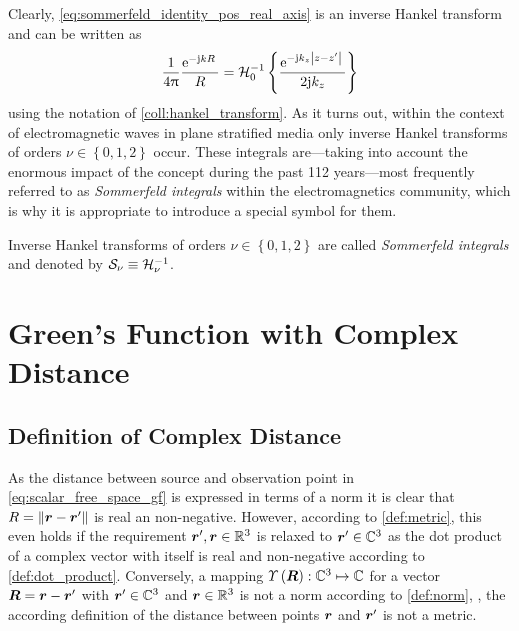 Clearly, \eqref{eq:sommerfeld_identity_pos_real_axis} is an inverse Hankel
transform and can be written as
\begin{equation}\label{eq:sommerfeld_identity_by_inverse_hankel_transform}
	\frac{1}{4\uppi}
	\frac{\mathrm{e}^{-\mathrm{j} k R}\,}{R} = 
	\mathcal{H}^{-1}_{0}
	\left\{ \frac{\mathrm{e}^{-\mathrm{j} k_z \left\vert z - z^\prime\right\vert}\,}{2 \mathrm{j} k_z} \right\} 
\end{equation}
using the notation of \cref{coll:hankel_transform}.
As it turns out, within the context of electromagnetic waves in plane stratified
media only inverse Hankel transforms of orders $\nu \in \left\{0, 1, 2\right\}$
occur.
These integrals are---taking into account the enormous impact of the
concept during the past 112 years---most frequently referred to as
\emph{Sommerfeld integrals} within the electromagnetics community, which is why
it is appropriate to introduce a special symbol for them.
\begin{definition}	
	Inverse Hankel transforms of orders $\nu \in \left\{0, 1, 2\right\}$
	are called \emph{Sommerfeld integrals} and denoted by
	$\mathcal{S}_{\nu} \equiv \mathcal{H}^{-1}_{\nu}$.
\end{definition}











\section{Green's Function with Complex Distance}
\label{sec:greens_function_cmplx_src_pts}






\subsection{Definition of Complex Distance}
\label{subsec:def_cmplx_distance}

As the distance between source and observation point in
\eqref{eq:scalar_free_space_gf} is expressed in terms of a norm
it is clear that $\rdiffNormSymbol = \rdiffNorm$ is real an non-negative.
However, according to \cref{def:metric}, this even
holds if the requirement $\rsrc, \robs \in \R^3$ is relaxed to
$\rsrc \in \C^3$ as the dot product of a complex vector with itself
is real and non-negative according to \cref{def:dot_product}.
Conversely, a mapping $\cmplxlength{\rdiffSymbol}: \C^3 \mapsto \C$ for a vector
$\rdiffSymbol = \rdiff$ with $\rsrc\in \C^3$ and $\robs \in \R^3$ is not a norm
according to \cref{def:norm}, \ie, the according definition of the distance
between points $\robs$ and $\rsrc$ is not a metric.

